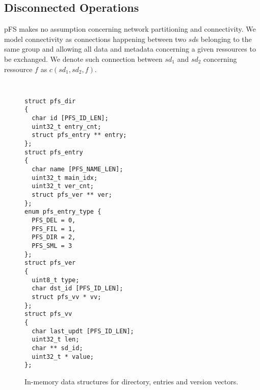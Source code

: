 \subsection{Disconnected Operations}

pFS makes no assumption concerning network partitioning and
connectivity. We model connectivity as connections happening between
two $sd$s belonging to the same group and allowing all data and
metadata concerning a given ressources to be exchanged. We denote such
connection between $sd_{1}$ and $sd_{2}$ concerning ressource $f$ as
$c(sd_{1}, sd_{2}, f)$.

\begin{figure}[t]
\begin{center}
{\tt \small
\begin{verbatim}
struct pfs_dir
{
  char id [PFS_ID_LEN];
  uint32_t entry_cnt;
  struct pfs_entry ** entry;
};
struct pfs_entry
{
  char name [PFS_NAME_LEN];
  uint32_t main_idx;
  uint32_t ver_cnt; 
  struct pfs_ver ** ver;
};
enum pfs_entry_type {
  PFS_DEL = 0,
  PFS_FIL = 1,
  PFS_DIR = 2,
  PFS_SML = 3 
};
struct pfs_ver
{
  uint8_t type;
  char dst_id [PFS_ID_LEN];
  struct pfs_vv * vv;
};
struct pfs_vv
{ 
  char last_updt [PFS_ID_LEN];
  uint32_t len;
  char ** sd_id;
  uint32_t * value;
};
\end{verbatim}
}
\end{center}
\caption{\label{MemStruct}
{\small In-memory data structures for directory, entries and version
  vectors.}}
\end{figure}

